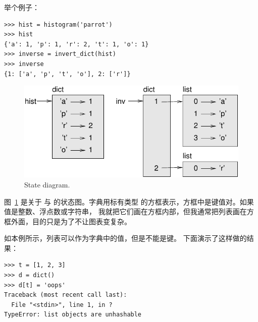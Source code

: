 
举个例子：

\begin{lstlisting}
>>> hist = histogram('parrot')
>>> hist
{'a': 1, 'p': 1, 'r': 2, 't': 1, 'o': 1}
>>> inverse = invert_dict(hist)
>>> inverse
{1: ['a', 'p', 't', 'o'], 2: ['r']}
\end{lstlisting}

\begin{figure}
\centerline
{\includegraphics[scale=0.8]{../source/figs/dict1.pdf}}
\caption{State diagram.}
\label{fig.dict1}
\end{figure}


图~\ref{fig.dict1} 是关于  与  的状态图。字典用标有类型  的方框表示，方框中是键值对。如果值是整数、浮点数或字符串，
我就把它们画在方框内部，但我通常把列表画在方框外面，目的只是为了不让图表变复杂。

  


如本例所示，列表可以作为字典中的值，但是不能是键。
下面演示了这样做的结果：

  

\begin{lstlisting}
>>> t = [1, 2, 3]
>>> d = dict()
>>> d[t] = 'oops'
Traceback (most recent call last):
  File "<stdin>", line 1, in ?
TypeError: list objects are unhashable
\end{lstlisting}

